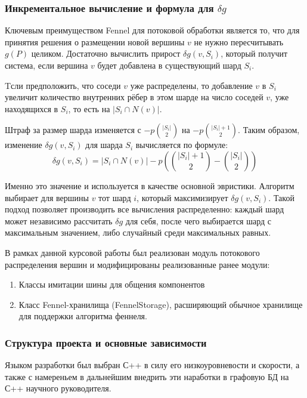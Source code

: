\subsubsection{Инкрементальное вычисление и формула для \(\delta g\)}

Ключевым преимуществом Fennel для потоковой обработки является то, что для принятия решения о размещении новой вершины \(v\) не нужно пересчитывать \(g(P)\) целиком. Достаточно вычислить прирост \(\delta g(v, S_i)\), который получит система, если вершина \(v\) будет добавлена в существующий шард \(S_i\).

Tсли предположить, что соседи \(v\) уже распределены, то добавление \(v\) в \(S_i\) увеличит количество внутренних рёбер в этом шарде на число соседей \(v\), уже находящихся в \(S_i\), то есть на \(|S_i \cap N(v)|\).

Штраф за размер шарда изменяется с \(- p\binom{|S_i|}{2}\) на \(- p\binom{|S_i|+1}{2}\). Таким образом, изменение \(\delta g(v, S_i)\) для шарда \(S_i\) вычисляется по формуле:
\begin{equation} \label{eq:fennel_delta}
\delta g(v, S_i) = |S_i \cap N(v)| - p (\binom{|S_i|+1}{2} - \binom{|S_i|}{2})
\end{equation}

Именно это значение и используется в качестве основной эвристики. Алгоритм выбирает для вершины \(v\) тот шард \(i\), который максимизирует \(\delta g(v, S_i)\). Такой подход позволяет производить все вычисления распределенно: каждый шард может независимо рассчитать \(\delta g\) для себя, после чего выбирается шард с максимальным значением, либо случайный среди максимальных равных.

В рамках данной курсовой работы был реализован модуль потокового распределения вершин и модифицированы реализованные ранее модули:
\begin{enumerate}
    \item Классы имитации шины для общения компонентов
    \item Класс Fennel-хранилища (FennelStorage), расширяющий обычное хранилище для поддержки алгоритма феннеля.
\end{enumerate}

\subsubsection{Структура проекта и основные зависимости}

Языком разработки был выбран С++ в силу его низкоуровневости и скорости, а также с намереньем в дальнейшим внедрить эти наработки в графовую БД на С++ научного руководителя.

